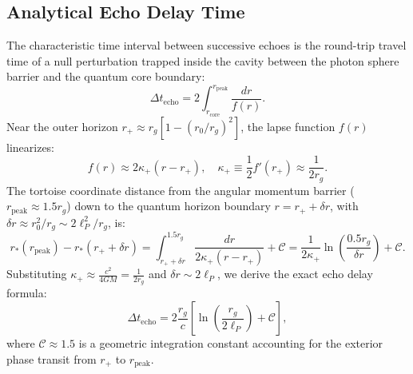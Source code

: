 \documentclass[11pt,a4paper]{article}
\begin{document}
\subsection{Analytical Echo Delay Time}
The characteristic time interval between successive echoes is the round-trip travel time of a null perturbation trapped inside the cavity between the photon sphere barrier and the quantum core boundary:
\begin{equation}
\Delta t_{\mathrm{echo}} = 2 \int_{r_{\mathrm{core}}}^{r_{\mathrm{peak}}} \frac{dr}{f(r)}.
\label{eq:echo_integral}
\end{equation}
Near the outer horizon $r_+ \approx r_g [1 - (r_0/r_g)^2]$, the lapse function $f(r)$ linearizes:
\begin{equation}
f(r) \approx 2 \kappa_+ (r - r_+), \quad \kappa_+ \equiv \frac{1}{2} f'(r_+) \approx \frac{1}{2 r_g}.
\end{equation}
The tortoise coordinate distance from the angular momentum barrier ($r_{\mathrm{peak}} \approx 1.5 r_g$) down to the quantum horizon boundary $r = r_+ + \delta r$, with $\delta r \approx r_0^2 / r_g \sim 2\ell_P^2 / r_g$, is:
\begin{equation}
r_*(r_{\mathrm{peak}}) - r_*(r_+ + \delta r) = \int_{r_+ + \delta r}^{1.5 r_g} \frac{dr}{2\kappa_+ (r - r_+)} + \mathcal{C} = \frac{1}{2\kappa_+} \ln\left( \frac{0.5 r_g}{\delta r} \right) + \mathcal{C}.
\end{equation}
Substituting $\kappa_+ \approx \frac{c^2}{4 G M} = \frac{1}{2 r_g}$ and $\delta r \sim 2\ell_P$, we derive the exact echo delay formula:
\begin{equation}
\Delta t_{\mathrm{echo}} = 2 \frac{r_g}{c} \left[ \ln\left( \frac{r_g}{2\ell_P} \right) + \mathcal{C} \right],
\label{eq:echo_exact}
\end{equation}
where $\mathcal{C} \approx 1.5$ is a geometric integration constant accounting for the exterior phase transit from $r_+$ to $r_{\mathrm{peak}}$.
\end{document}
